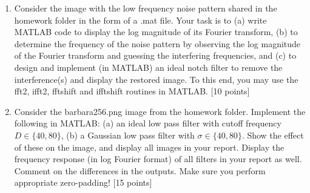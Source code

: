 \documentclass[11pt]{article}
\begin{document}
\begin{enumerate}
\item Consider the image with the low frequency noise pattern shared in the homework folder in the form of a .mat file. Your task is to (a) write MATLAB code to display the log magnitude of its Fourier transform, (b) to determine the frequency of the noise pattern by observing the log magnitude of the Fourier transform and guessing the interfering frequencies, and (c) to design and implement (in MATLAB) an ideal notch filter to remove the interference(s) and display the restored image. To this end, you may use the fft2, ifft2, fftshift and ifftshift routines in MATLAB. \textsf{[10 points]}

\item Consider the barbara256.png image from the homework folder. Implement the following in MATLAB: (a) an ideal low pass filter with cutoff frequency $D \in \{40, 80\}$, (b) a Gaussian low pass filter with $\sigma \in \{40,80\}$. Show the effect of these on the image, and display all images in your report. Display the frequency response (in log Fourier format) of all filters in your report as well. Comment on the differences in the outputs. Make sure you perform appropriate zero-padding! \textsf{[15 points]}


\end{enumerate}
\end{document}

